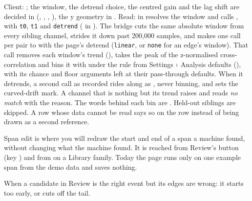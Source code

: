 \begin{underthehood}
Client: ; the window, the detrend choice,
the centred gain and the lag shift are decided in 
(, , , ), the
y geometry in . Read:  in
 resolves the window and calls ,
 with \texttt{t0}, \texttt{t1} and \texttt{detrend} ( in
). The bridge cuts the same absolute window from every
sibling channel, strides it down past 200{,}000 samples, and makes one call per pair to
 with the page's detrend (\texttt{linear}, or
\texttt{none} for an edge's window). That call removes each window's trend
(), takes the peak of the z-normalised cross-correlation and bins it with
 under the rule from Settings › Analysis defaults (),
with its chance and floor arguments left at their pass-through defaults. When it detrends, a
second call as recorded rides along as , never binning, and
 sets the curved-drift mark. A channel that is nothing but its trend raises
 and reads \emph{no match} with the reason. The words behind each bin are
. Held-out siblings are skipped. A row whose data cannot
be read says so on the row instead of being drawn as a second reference.
\end{underthehood}

Span edit is where you will redraw the start and end of a span a machine found, without
changing what the machine found. It is reached from Review's 
button (key ) and from  on a Library family. Today the page runs
only on one example span from the demo data and saves nothing.

When a candidate in Review is the right event but its edges are wrong: it starts too early,
or cuts off the tail.


